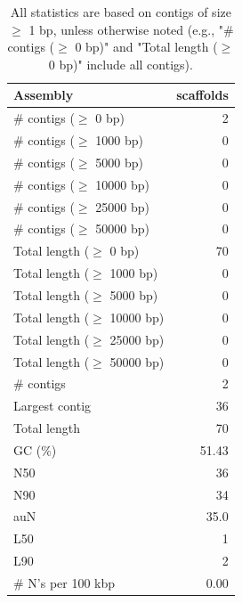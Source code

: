 \documentclass[12pt,a4paper]{article}
\begin{document}
\begin{table}[ht]
\begin{center}
\caption{All statistics are based on contigs of size $\geq$ 1 bp, unless otherwise noted (e.g., "\# contigs ($\geq$ 0 bp)" and "Total length ($\geq$ 0 bp)" include all contigs).}
\begin{tabular}{|l*{1}{|r}|}
\hline
Assembly & scaffolds \\ \hline
\# contigs ($\geq$ 0 bp) & 2 \\ \hline
\# contigs ($\geq$ 1000 bp) & 0 \\ \hline
\# contigs ($\geq$ 5000 bp) & 0 \\ \hline
\# contigs ($\geq$ 10000 bp) & 0 \\ \hline
\# contigs ($\geq$ 25000 bp) & 0 \\ \hline
\# contigs ($\geq$ 50000 bp) & 0 \\ \hline
Total length ($\geq$ 0 bp) & 70 \\ \hline
Total length ($\geq$ 1000 bp) & 0 \\ \hline
Total length ($\geq$ 5000 bp) & 0 \\ \hline
Total length ($\geq$ 10000 bp) & 0 \\ \hline
Total length ($\geq$ 25000 bp) & 0 \\ \hline
Total length ($\geq$ 50000 bp) & 0 \\ \hline
\# contigs & 2 \\ \hline
Largest contig & 36 \\ \hline
Total length & 70 \\ \hline
GC (\%) & 51.43 \\ \hline
N50 & 36 \\ \hline
N90 & 34 \\ \hline
auN & 35.0 \\ \hline
L50 & 1 \\ \hline
L90 & 2 \\ \hline
\# N's per 100 kbp & 0.00 \\ \hline
\end{tabular}
\end{center}
\end{table}
\end{document}
